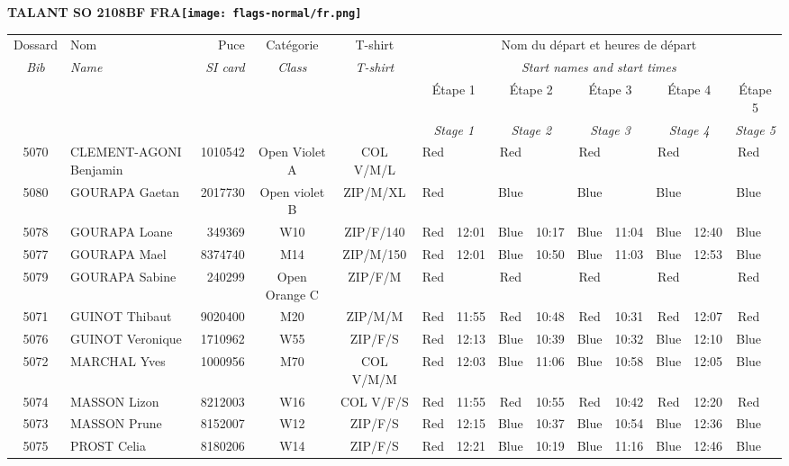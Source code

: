 \documentclass{report}
\begin{document}
\newpage
  \Huge \centering \bfseries TALANT SO 2108BF FRA\normalfont \footnotesize \sffamily \hfill \texttt{[image: flags-normal/fr.png]} \newline 
  \begin{longtable}{|c|l|r|c|c|*{5}{cc|}}
    Dossard & Nom  & Puce    & Catégorie & T-shirt & \multicolumn{10}{c|}{Nom du départ et heures de départ} \\
    \itshape Bib     & \itshape Name & \itshape SI card & \itshape Class  & \itshape  T-shirt  & \multicolumn{10}{c|}{\itshape Start names and start times} \\
    \hline
    & & & & & \multicolumn{2}{c|}{Étape 1} & \multicolumn{2}{c|}{Étape 2} & \multicolumn{2}{c|}{Étape 3} & \multicolumn{2}{c|}{Étape 4} & \multicolumn{2}{c|}{Étape 5} \\
    & & & & & \multicolumn{2}{c|}{\itshape Stage 1} & \multicolumn{2}{c|}{\itshape Stage 2} & \multicolumn{2}{c|}{\itshape Stage 3} & \multicolumn{2}{c|}{\itshape Stage 4} & \multicolumn{2}{c|}{\itshape Stage 5} \\
    \hline
    5070 & CLEMENT-AGONI Benjamin & 1010542 & Open Violet A & COL V/M/L & Red &   & Red &   & Red &   & Red &   & Red &  \\
    5080 & GOURAPA Gaetan & 2017730 & Open violet B & ZIP/M/XL & Red &   & Blue &   & Blue &   & Blue &   & Blue &  \\
    5078 & GOURAPA Loane & 349369 & W10 & ZIP/F/140 & Red & 12:01 & Blue & 10:17 & Blue & 11:04 & Blue & 12:40 & Blue &  \\
    5077 & GOURAPA Mael & 8374740 & M14 & ZIP/M/150 & Red & 12:01 & Blue & 10:50 & Blue & 11:03 & Blue & 12:53 & Blue &  \\
    5079 & GOURAPA Sabine & 240299 & Open Orange C & ZIP/F/M & Red &   & Red &   & Red &   & Red &   & Red &  \\
    5071 & GUINOT Thibaut & 9020400 & M20 & ZIP/M/M & Red & 11:55 & Red & 10:48 & Red & 10:31 & Red & 12:07 & Red &  \\
    5076 & GUINOT Veronique & 1710962 & W55 & ZIP/F/S & Red & 12:13 & Blue & 10:39 & Blue & 10:32 & Blue & 12:10 & Blue &  \\
    5072 & MARCHAL Yves & 1000956 & M70 & COL V/M/M & Red & 12:03 & Blue & 11:06 & Blue & 10:58 & Blue & 12:05 & Blue &  \\
    5074 & MASSON Lizon & 8212003 & W16 & COL V/F/S & Red & 11:55 & Red & 10:55 & Red & 10:42 & Red & 12:20 & Red &  \\
    5073 & MASSON Prune & 8152007 & W12 & ZIP/F/S & Red & 12:15 & Blue & 10:37 & Blue & 10:54 & Blue & 12:36 & Blue &  \\
    5075 & PROST Celia & 8180206 & W14 & ZIP/F/S & Red & 12:21 & Blue & 10:19 & Blue & 11:16 & Blue & 12:46 & Blue &  \\
  \end{longtable}
\end{document}
